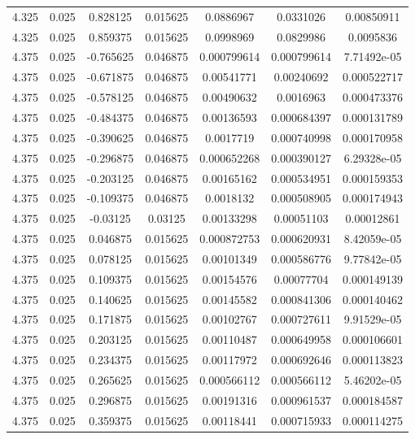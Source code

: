 \begin{table}[bh]
\begin{center}
{\begin{tabular}{ccccccc}
4.325	 & 0.025 & 	0.828125	 & 0.015625	 & 0.0886967	 & 0.0331026	 & 0.00850911 \\ 
4.325	 & 0.025 & 	0.859375	 & 0.015625	 & 0.0998969	 & 0.0829986	 & 0.0095836 \\ 
4.375	 & 0.025 & 	-0.765625	 & 0.046875	 & 0.000799614	 & 0.000799614	 & 7.71492e-05 \\ 
4.375	 & 0.025 & 	-0.671875	 & 0.046875	 & 0.00541771	 & 0.00240692	 & 0.000522717 \\ 
4.375	 & 0.025 & 	-0.578125	 & 0.046875	 & 0.00490632	 & 0.0016963	 & 0.000473376 \\ 
4.375	 & 0.025 & 	-0.484375	 & 0.046875	 & 0.00136593	 & 0.000684397	 & 0.000131789 \\ 
4.375	 & 0.025 & 	-0.390625	 & 0.046875	 & 0.0017719	 & 0.000740998	 & 0.000170958 \\ 
4.375	 & 0.025 & 	-0.296875	 & 0.046875	 & 0.000652268	 & 0.000390127	 & 6.29328e-05 \\ 
4.375	 & 0.025 & 	-0.203125	 & 0.046875	 & 0.00165162	 & 0.000534951	 & 0.000159353 \\ 
4.375	 & 0.025 & 	-0.109375	 & 0.046875	 & 0.0018132	 & 0.000508905	 & 0.000174943 \\ 
4.375	 & 0.025 & 	-0.03125	 & 0.03125	 & 0.00133298	 & 0.00051103	 & 0.00012861 \\ 
4.375	 & 0.025 & 	0.046875	 & 0.015625	 & 0.000872753	 & 0.000620931	 & 8.42059e-05 \\ 
4.375	 & 0.025 & 	0.078125	 & 0.015625	 & 0.00101349	 & 0.000586776	 & 9.77842e-05 \\ 
4.375	 & 0.025 & 	0.109375	 & 0.015625	 & 0.00154576	 & 0.00077704	 & 0.000149139 \\ 
4.375	 & 0.025 & 	0.140625	 & 0.015625	 & 0.00145582	 & 0.000841306	 & 0.000140462 \\ 
4.375	 & 0.025 & 	0.171875	 & 0.015625	 & 0.00102767	 & 0.000727611	 & 9.91529e-05 \\ 
4.375	 & 0.025 & 	0.203125	 & 0.015625	 & 0.00110487	 & 0.000649958	 & 0.000106601 \\ 
4.375	 & 0.025 & 	0.234375	 & 0.015625	 & 0.00117972	 & 0.000692646	 & 0.000113823 \\ 
4.375	 & 0.025 & 	0.265625	 & 0.015625	 & 0.000566112	 & 0.000566112	 & 5.46202e-05 \\ 
4.375	 & 0.025 & 	0.296875	 & 0.015625	 & 0.00191316	 & 0.000961537	 & 0.000184587 \\ 
4.375	 & 0.025 & 	0.359375	 & 0.015625	 & 0.00118441	 & 0.000715933	 & 0.000114275 \\ 

\end{tabular}}
\end{center}
\end{table}
